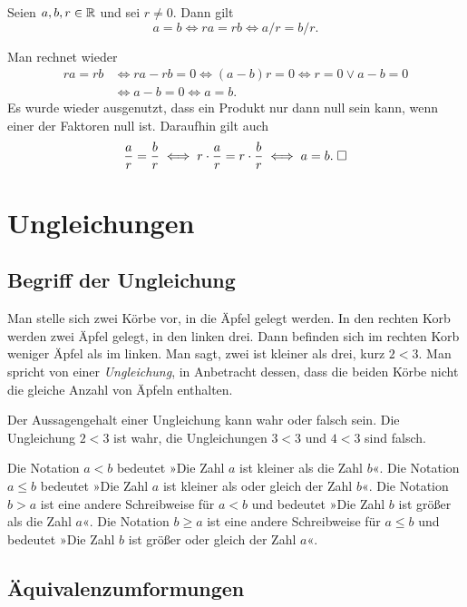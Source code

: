 \begin{Satz}[Äquivalenzumformungen]
Seien $a,b,r\in\mathbb R$ und sei $r\ne 0$. Dann gilt
\[a=b\iff ra=rb\iff a/r=b/r.\]
\end{Satz}
 Man rechnet wieder
\begin{align*}
ra = rb&\iff ra-rb=0\iff (a-b)r=0\iff r=0\lor a-b=0\\
&\iff a-b=0\iff a=b.
\end{align*}
Es wurde wieder ausgenutzt, dass ein Produkt nur dann null sein
kann, wenn einer der Faktoren null ist. Daraufhin gilt auch
\[\frac{a}{r}=\frac{b}{r}\iff r\cdot\frac{a}{r}=r\cdot\frac{b}{r}
\iff a=b.\;\Box\]

\noindent


\newpage
\section{Ungleichungen}

\subsection{Begriff der Ungleichung}%

Man stelle sich zwei Körbe vor, in die Äpfel gelegt werden.
In den rechten Korb werden zwei Äpfel gelegt, in den linken drei.
Dann befinden sich im rechten Korb weniger Äpfel als im linken.
Man sagt, zwei ist kleiner als drei, kurz $2<3$. Man spricht von
einer \emph{Ungleichung}, in Anbetracht dessen, dass die beiden
Körbe nicht die gleiche Anzahl von Äpfeln enthalten.

Der Aussagengehalt einer Ungleichung kann wahr oder falsch sein.
Die Ungleichung $2<3$ ist wahr, die Ungleichungen $3<3$ und
$4<3$ sind falsch.

\begin{Definition}[Ungleichungsrelation]
Die Notation $a<b$ bedeutet »Die Zahl $a$ ist kleiner als
die Zahl $b$«. Die Notation $a\le b$ bedeutet »Die Zahl $a$
ist kleiner als oder gleich der Zahl $b$«. Die Notation
$b>a$ ist eine andere Schreibweise für $a<b$ und bedeutet
»Die Zahl $b$ ist größer als die Zahl $a$«. Die Notation
$b\ge a$ ist eine andere Schreibweise für $a\le b$ und
bedeutet »Die Zahl $b$ ist größer oder gleich der Zahl $a$«.
\end{Definition}

\subsection{Äquivalenzumformungen}%


